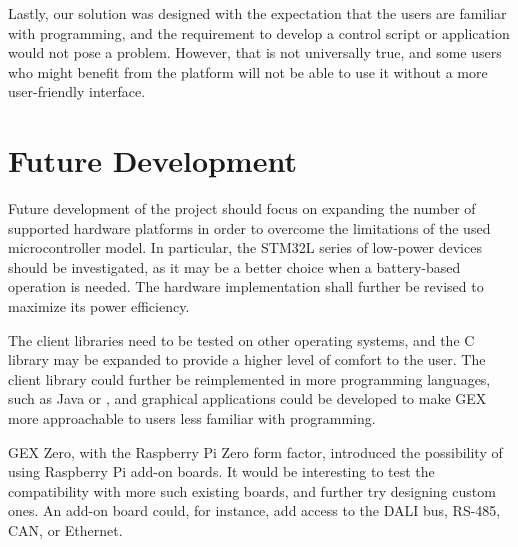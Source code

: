 Lastly, our solution was designed with the expectation that the users are familiar with programming, and the requirement to develop a control script or application would not pose a problem. However, that is not universally true, and some users who might benefit from the platform will not be able to use it without a more user-friendly interface.

\section{Future Development}

Future development of the project should focus on expanding the number of supported hardware platforms in order to overcome the limitations of the used microcontroller model. In particular, the STM32L series of low-power devices should be investigated, as it may be a better choice when a battery-based operation is needed. The hardware implementation shall further be revised to maximize its power efficiency.

The client libraries need to be tested on other operating systems, and the C library may be expanded to provide a higher level of comfort to the user. The client library could further be reimplemented in more programming languages, such as Java or \CS, and graphical applications could be developed to make GEX more approachable to users less familiar with programming.

GEX Zero, with the Raspberry Pi Zero form factor, introduced the possibility of using Raspberry Pi add-on boards. It would be interesting to test the compatibility with more such existing boards, and further try designing custom ones. An add-on board could, for instance, add access to the \gls{DALI} bus, RS-485, \gls{CAN}, or Ethernet.





